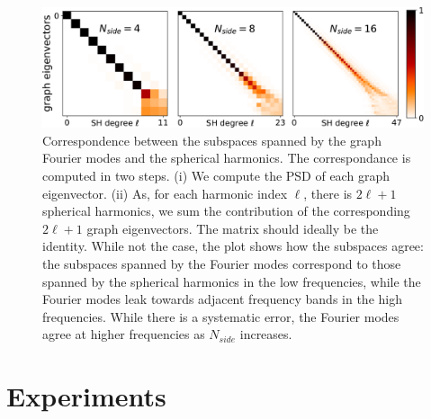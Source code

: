 \documentclass{article} %
\newcommand{\figref}[1]{figure~\ref{fig:#1}}
\renewcommand{\b}[1]{{\bm{#1}}}   %
\newcommand{\1}{\b{1}}              %
\newcommand{\0}{\b{0}}              %
\newcommand{\todo}[1]{{\color[rgb]{.6,.1,.6}{#1}}}
\begin{document}
\begin{figure}[ht!]
	\centering
	\includegraphics[width=0.9\linewidth]{subspace_harmonics_eigenvectors_v2}
	\caption{Correspondence between the subspaces spanned by the graph Fourier modes and the spherical harmonics.
		The correspondance is computed in two steps. (i) We compute the PSD of each graph eigenvector.
		(ii) As, for each harmonic index $\ell$, there is $2\ell+1$ spherical harmonics, we sum the contribution of the corresponding $2\ell+1$ graph eigenvectors.
		The matrix should ideally be the identity.
		While not the case, the plot shows how the subspaces agree: the subspaces spanned by the Fourier modes correspond to those spanned by the spherical harmonics in the low frequencies, while the Fourier modes leak towards adjacent frequency bands in the high frequencies.
		While there is a systematic error, the Fourier modes agree at higher frequencies as $N_{side}$ increases.}
		\label{fig:subspace_harmonics_eigenvectors}
\end{figure}



\todo{new results from Martino: becomes better in BN setting, currently under study}

\todo{we have less rich operations (compared to the most general linear equivariant map) by restricting our filters to be radial, but does it matter in practice?}
\todo{isotropic filters provide invariance to the third rotation}

\section{Experiments}
\end{document}
